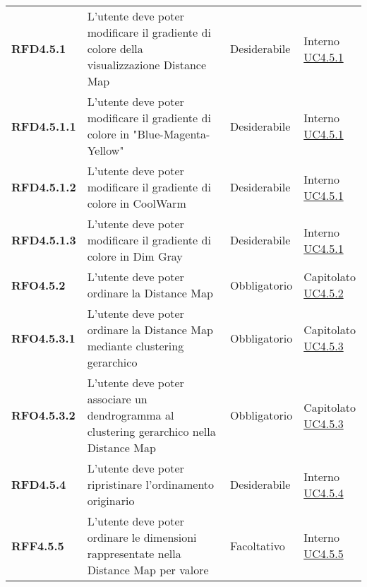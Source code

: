 \begin{longtable}[H]{>{\raggedright\bfseries}m{20mm} >{\raggedright}m{90mm} >{\raggedright}m{28mm} >{\raggedright\arraybackslash}m{30mm}}
    RFD4.5.1
    & L'utente deve poter modificare il gradiente di colore della visualizzazione Distance Map
    & Desiderabile
    & \makecell{ Interno \\ \hyperref[par:uc4.5.1]{UC4.5.1} }\\

    RFD4.5.1.1
    & L'utente deve poter modificare il gradiente di colore in "Blue-Magenta-Yellow"
    & Desiderabile
    & \makecell{ Interno \\ \hyperref[par:uc4.5.1]{UC4.5.1} }\\

    RFD4.5.1.2
    & L'utente deve poter modificare il gradiente di colore in CoolWarm
    & Desiderabile
    & \makecell{ Interno \\ \hyperref[par:uc4.5.1]{UC4.5.1} }\\

    RFD4.5.1.3
    & L'utente deve poter modificare il gradiente di colore in Dim Gray
    & Desiderabile
    & \makecell{ Interno \\ \hyperref[par:uc4.5.1]{UC4.5.1} }\\

    RFO4.5.2
    & L'utente deve poter ordinare la Distance Map
    & Obbligatorio
    & \makecell{ Capitolato \\ \hyperref[par:uc4.5.2]{UC4.5.2} }\\

    RFO4.5.3.1
    & L'utente deve poter ordinare la Distance Map mediante clustering gerarchico
    & Obbligatorio
    & \makecell{ Capitolato \\ \hyperref[par:uc4.5.3]{UC4.5.3} }\\

    RFO4.5.3.2
    & L'utente deve poter associare un dendrogramma al clustering gerarchico nella Distance Map
    & Obbligatorio
    & \makecell{ Capitolato \\ \hyperref[par:uc4.5.3]{UC4.5.3} }\\

    RFD4.5.4
    & L'utente deve poter ripristinare l'ordinamento originario
    & Desiderabile
    & \makecell{ Interno \\ \hyperref[par:uc4.5.4]{UC4.5.4} }\\

    RFF4.5.5
    & L'utente deve poter ordinare le dimensioni rappresentate nella Distance Map per valore
    & Facoltativo
    & \makecell{ Interno \\ \hyperref[par:uc4.5.5]{UC4.5.5} }\\


\end{longtable}
